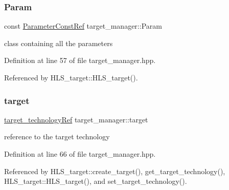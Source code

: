 \mbox{\label{classtarget__manager_adbf98931b360d2f93983a484b5af88db}} 
\subsubsection{\texorpdfstring{Param}{Param}}
{\footnotesize\ttfamily const \hyperlink{Parameter_8hpp_a37841774a6fcb479b597fdf8955eb4ea}{Parameter\+Const\+Ref} target\+\_\+manager\+::\+Param\hspace{0.3cm}{\ttfamily [protected]}}



class containing all the parameters 



Definition at line 57 of file target\+\_\+manager.\+hpp.



Referenced by H\+L\+S\+\_\+target\+::\+H\+L\+S\+\_\+target().

\mbox{\label{classtarget__manager_a87eedb7aab65e0df7b4ca0147a0908dc}} 
\subsubsection{\texorpdfstring{target}{target}}
{\footnotesize\ttfamily \hyperlink{target__technology_8hpp_a16af97aadc4eb998c2c9ec7fba5ccecd}{target\+\_\+technology\+Ref} target\+\_\+manager\+::target\hspace{0.3cm}{\ttfamily [protected]}}



reference to the target technology 



Definition at line 66 of file target\+\_\+manager.\+hpp.



Referenced by H\+L\+S\+\_\+target\+::create\+\_\+target(), get\+\_\+target\+\_\+technology(), H\+L\+S\+\_\+target\+::\+H\+L\+S\+\_\+target(), and set\+\_\+target\+\_\+technology().

\mbox{\label{classtarget__manager_a9169f1cec19f8474a03781ca1c80fff0}} 
